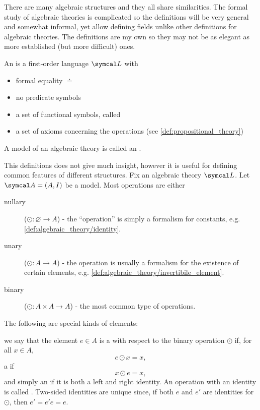\begin{definition}\label{def:algebraic_theory}\cite[remark 2.1.4]{Leinster2014}
  There are many algebraic structures and they all share similarities. The formal study of algebraic theories is complicated so the definitions will be very general and somewhat informal, yet allow defining fields unlike other definitions for algebraic theories. The definitions are my own so they may not be as elegant as more established (but more difficult) ones.

  An  is a first-order language \( \Cal{L} \) with
  \begin{itemize}
    \item formal equality \( \doteq \)
    \item no predicate symbols
    \item a set of functional symbols, called 
    \item a set of axioms concerning the operations (see \cref{def:propositional_theory})
  \end{itemize}

  A model of an algebraic theory is called an .

  This definitions does not give much insight, however it is useful for defining common features of different structures. Fix an algebraic theory \( \Cal{L} \). Let \( \Cal{A} = (A, I) \) be a model. Most operations are either
  \begin{description}
    \item[nullary] (\( \odot: \varnothing \to A \)) - the \enquote{operation} is simply a formalism for constants, e.g. \ref{def:algebraic_theory/identity}.
    \item[unary] (\( \odot: A \to A \)) - the operation is usually a formalism for the existence of certain elements, e.g. \ref{def:algebraic_theory/invertibile_element}.
    \item[binary] (\( \odot: A \times A \to A \)) - the most common type of operations.
  \end{description}

  The following are special kinds of elements:
  \begin{defenum}
     we say that the element \( e \in A \) is a  with respect to the binary operation \( \odot \) if, for all \( x \in A \),
    \begin{equation*}
      e \odot x = x,
    \end{equation*}
    a  if
    \begin{equation*}
      x \odot e = x,
    \end{equation*}
    and simply an  if it is both a left and right identity. An operation with an identity is called . Two-sided identities are unique since, if both \( e \) and \( e' \) are identities for \( \odot \), then \( e' = e' e = e \).


\end{defenum}
\end{definition}
